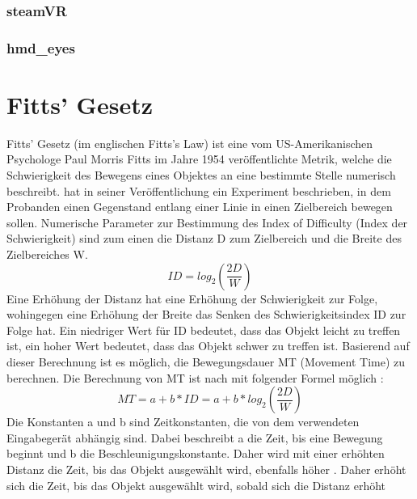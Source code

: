 \subsubsection{steamVR}

\subsubsection{hmd\_eyes}

\section{Fitts' Gesetz}
Fitts' Gesetz (im englischen Fitts's Law) ist eine vom US-Amerikanischen Psychologe Paul Morris Fitts im Jahre 1954 veröffentlichte Metrik, welche die Schwierigkeit des Bewegens eines Objektes an eine bestimmte Stelle numerisch beschreibt. \citeauthor{Fitts.1992} hat in seiner Veröffentlichung ein Experiment beschrieben, in dem Probanden einen Gegenstand entlang einer Linie in einen Zielbereich bewegen sollen. Numerische Parameter zur Bestimmung des \glqq Index of Difficulty\grqq{} (Index der Schwierigkeit) sind zum einen die Distanz D zum Zielbereich und die Breite des Zielbereiches W\cite{Fitts.1992}.
\begin{equation}
ID = log_2 \left ( \frac{2D}{W} \right )
\end{equation}
Eine Erhöhung der Distanz hat eine Erhöhung der Schwierigkeit zur Folge, wohingegen eine Erhöhung der Breite das Senken des Schwierigkeitsindex ID zur Folge hat. Ein niedriger Wert für ID bedeutet, dass das Objekt leicht zu treffen ist, ein hoher Wert bedeutet, dass das Objekt schwer zu treffen ist\cite{Fitts.1992}. 
Basierend auf dieser Berechnung ist es möglich, die Bewegungsdauer MT (Movement Time) zu berechnen. Die Berechnung von MT ist nach \citeauthor{Graham.1996} mit folgender Formel möglich \cite{Graham.1996} :
\begin{equation}
MT = a + b * ID = a + b * log_2 \left ( \frac{2D}{W} \right )
\end{equation}
Die Konstanten a und b sind Zeitkonstanten, die von dem verwendeten Eingabegerät abhängig sind. Dabei beschreibt a die Zeit, bis eine Bewegung beginnt und b die Beschleunigungskonstante. Daher wird mit einer erhöhten Distanz die Zeit, bis das Objekt ausgewählt wird, ebenfalls höher \cite{Graham.1996}. {\color{red} Daher erhöht sich die Zeit, bis das Objekt ausgewählt wird, sobald sich die Distanz erhöht}

